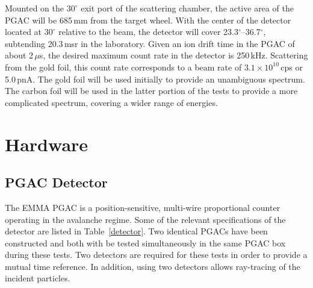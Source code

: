 Mounted on the $30^\circ$ exit port of the scattering chamber, the active area of the PGAC will be 685\,mm from the target wheel.  With the center of the detector located at $30^\circ$ relative to the beam, the detector will cover 23.3$^\circ$--36.7$^\circ$, subtending 20.3\,msr in the laboratory.  Given an ion drift time in the PGAC of about 2\,$\mu$s, the desired maximum count rate in the detector is 250\,kHz.  Scattering from the gold foil, this count rate corresponds to a beam rate of $3.1 \times 10^{10}$\,cps or 5.0\,pnA. %
The gold foil will be used initially to provide an unambiguous spectrum.  The carbon foil will be used in the latter portion of the tests to provide a more complicated spectrum, covering a wider range of energies.

\section{Hardware}
\subsection{PGAC Detector}
The EMMA PGAC is a position-sensitive, multi-wire proportional counter operating in the avalanche regime. Some of the relevant specifications of the detector are listed in Table~\ref{detector}.  Two identical PGACs have been constructed and both with be tested simultaneously in the same PGAC box during these tests.  Two detectors are required for these tests in order to provide a mutual time reference.  In addition, using two detectors allows ray-tracing of the incident particles.


